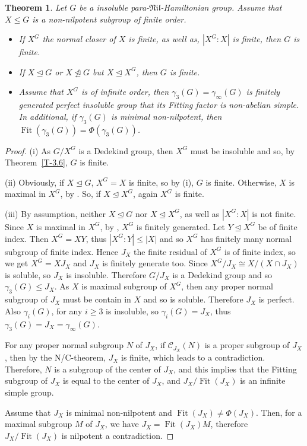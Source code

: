 \documentclass[11pt]{amsart}
\newtheorem{theorem}{Theorem}[section]
\DeclareMathOperator{\Fit}{Fit}
\newcommand{\sub}{\leqslant}
\newcommand{\C}{\mathcal{ C}}
\newcommand{\nor}{\trianglelefteq}
\newcommand{\nno}{\ntrianglelefteq}
\begin{document}
\begin{theorem}\label{T-3.12}
Let $G$ be a insoluble para-$\mathfrak{Nil}$-Hamiltonian group. Assume that $X\sub G$ is a non-nilpotent subgroup of finite order.
\begin{itemize}
\item[(i)] If $X^ G$ the normal closer of  $X$ is finite, as well as, $|X^G : X|$ is finite, then $G$ is finite. 
\item[(ii)] If $X\nor G$ or $X\nno G$ but $ X\nor X^G$, then $G$ is finite.
\item[(iii)] Assume that  $X^G$ is of infinite order, then $\gamma_3(G)=\gamma_{\infty}(G)$ is finitely generated perfect insoluble group that its Fitting factor is non-abelian simple. In additional, if $\gamma_3(G)$ is minimal non-nilpotent, then $\Fit(\gamma_3(G))=\Phi(\gamma_3(G))$.
\end{itemize}
\end{theorem}
\begin{proof}
(i) As $G/X^G$ is a Dedekind group, then $X^G$ must be insoluble and so, by Theorem~\ref{T-3.6}, $G$ is finite.

(ii) Obviously, if $X\nor G$, $X^G=X$ is finite, so by (i), $G$ is finite. Otherwise, $X$ is maximal in $X^G$, by \cite[Lemma 4.5]{DM}. So,  if $X\nor X^G$,  again $X^G$ is finite. 

(iii) By assumption, neither $X\nor G$ nor $X\nor X^G$, as well as $|X^G : X|$ is not finite. Since  $X$ is maximal in $X^G$, by \cite[Lemma 4.5]{DM}, $X^G$ is finitely generated. Let $Y\nor X^G$ be of finite index. Then $X^G=XY$, thus $|X^G : Y|\leq |X|$ and so $X^G$ has finitely many normal subgroup of finite index. Hence $J_X$
 the finite residual of $X^G$ is of finite index, so we get $X^G=XJ_X$ and $J_X$ is finitely generate too. Since $X^G/J_X\cong X/(X\cap J_X)$ is soluble, so $J_X$ is insoluble. Therefore $G/J_X$ is a Dedekind group and so $\gamma_3(G)\sub J_X$. As $X$ is maximal subgroup of $X^G$, then any proper normal subgroup of $J_X$ must be contain in $X$ and so is soluble. Therefore $J_X$ is perfect. 
 Also  $\gamma_i(G)$, for any $i\geq 3$ is insoluble, so $\gamma_i(G)=J_X$,  thus $\gamma_3(G)=J_X=\gamma_{\infty}(G)$. 
 
For any proper normal subgroup $N$ of $J_X$, if $\C_{J_X}(N)$ is a proper subgroup of $J_X$, then by the N/C-theorem, $J_X$ is finite, which leads to a contradiction. Therefore, $N$ is a subgroup of the center of $J_X$, and this implies that the Fitting subgroup of $J_X$ is equal to the center of $J_X$, and $J_X/\Fit(J_X)$ is an infinite simple group.
 
 Assume that $J_X$ is minimal non-nilpotent and $\Fit(J_X)\neq \Phi(J_X)$. Then, for a maximal subgroup $M$ of $J_X$, we have $J_X=\Fit(J_X)M$, therefore $J_X/\Fit(J_X)$ is nilpotent a contradiction.
 \end{proof}
\end{document}
